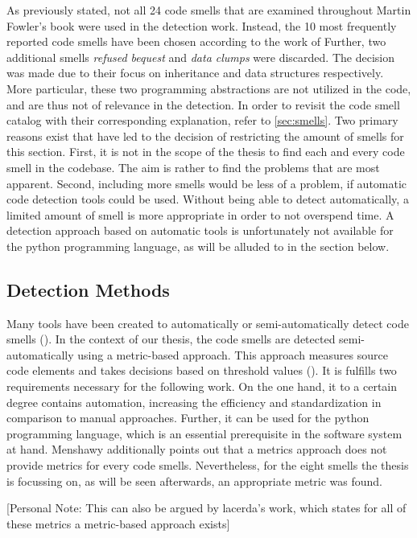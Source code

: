 As previously stated, not all 24 code smells that are examined throughout Martin Fowler's book were used in the detection work. Instead, the 10 most frequently reported code smells have been chosen according to the work of \textcite{lacerda2020} %
Further, two additional smells \emph{refused bequest} and \emph{data clumps} were discarded. The decision was made due to their focus on inheritance and data structures respectively. More particular, these two programming abstractions are not utilized in the code, and are thus not of relevance in the detection. In order to revisit the code smell catalog with their corresponding explanation, refer to \ref{sec:smells}. Two primary reasons exist that have led to the decision of restricting the amount of smells for this section. First, it is not in the scope of the thesis to find each and every code smell in the codebase. The aim is rather to find the problems that are most apparent. Second, including more smells would be less of a problem, if automatic code detection tools could be used. Without being able to detect automatically, a limited amount of smell is more appropriate in order to not overspend time. A detection approach based on automatic tools is unfortunately not available for the python programming language, as will be alluded to in the section below. 

\subsection{Detection Methods}
Many tools have been created to automatically or semi-automatically detect code smells (\cite{menshawy2021}). In the context of our thesis, the code smells are detected semi-automatically using a metric-based approach. This approach measures source code elements and takes decisions based on threshold values (\cite{menshawy2021}). It is fulfills two requirements necessary for the following work. On the one hand, it to a certain degree contains automation, increasing the efficiency and standardization in comparison to manual approaches. Further, it can be used for the python programming language, which is an essential prerequisite in the software system at hand. Menshawy additionally points out that a metrics approach does not provide metrics for every code smells. Nevertheless, for the eight smells the thesis is focussing on, as will be seen afterwards, an appropriate metric was found. 

[Personal Note: This can also be argued by lacerda's work, which states for all of these metrics a metric-based approach exists]

